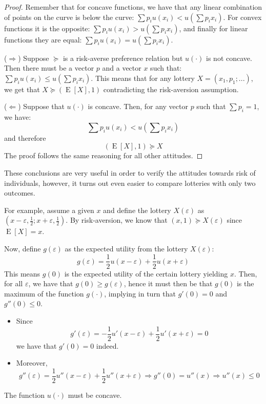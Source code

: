 \documentclass[12pt]{report}
\newcommand{\E}[1]{\operatorname{E}\left[#1\right]}
\begin{document}
\begin{proof}
Remember that for concave functions, we have that any linear combination of points on the curve is below the curve: $\sum p_iu(x_i) < u\left(\sum p_ix_i\right)$. For convex functions it is the opposite: $\sum p_iu(x_i) > u\left(\sum p_ix_i\right)$, and finally for linear functions they are equal: $\sum p_iu(x_i) = u\left(\sum p_ix_i\right)$.

($\Rightarrow$) Suppose $\succeq$ is a risk-averse preference relation but $u(\cdot)$ is not concave. Then there must be a vector $p$ and a vector $x$ such that: $\sum p_iu(x_i) \leq u\left(\sum p_ix_i\right)$. This means that for any lottery $X = (x_1, p_1; ...)$, we get that $X\succeq (\E{X},1)$ contradicting the risk-aversion assumption.

($\Leftarrow$) Suppose that $u(\cdot)$ is concave. Then, for any vector $p$ such that $\sum p_i = 1$, we have: $$\sum p_iu(x_i) < u(\sum p_ix_i)$$ and therefore $$(\E{X},1) \succeq X$$ The proof follows the same reasoning for all other attitudes.
\end{proof}

These conclusions are very useful in order to verify the attitudes towards risk of individuals, however, it turns out even easier to compare lotteries with only two outcomes. 

For example, assume a given $x$ and define the lottery $X(\varepsilon)$ as $(x-\varepsilon, \frac{1}{2} ; x+\varepsilon, \frac{1}{2})$. By risk-aversion, we know that $(x,1)\succeq X(\varepsilon)$ since $\E{X} = x$.

Now, define $g(\varepsilon)$ as the expected utility from the lottery $X(\varepsilon)$:$$g(\varepsilon) = \frac{1}{2}u(x-\varepsilon) + \frac{1}{2}u(x+\varepsilon)$$ This means $g(0)$ is the expected utility of the certain lottery yielding $x$. Then, for all $\varepsilon$, we have that $g(0)\geq g(\varepsilon)$, hence it must then be that $g(0)$ is the maximum of the function $g(\cdot)$, implying in turn that $g'(0) = 0$ and $g''(0) \leq 0$.\begin{itemize}
\item Since $$g'(\varepsilon) = -\frac{1}{2}u'(x-\varepsilon) + \frac{1}{2}u'(x+\varepsilon) = 0 $$we have that $g'(0) = 0$ indeed.
\item Moreover, $$g''(\varepsilon) = \frac{1}{2}u''(x-\varepsilon) + \frac{1}{2}u''(x+\varepsilon) \Rightarrow g''(0) = u''(x) \Rightarrow u''(x)\leq 0$$ 
\end{itemize}
The function $u(\cdot)$ must be concave.
\end{document}
